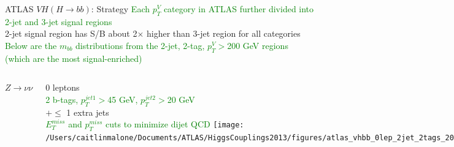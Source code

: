 \documentclass{beamer}
\begin{document}
\begin{frame}{ATLAS $VH (H\rightarrow bb)$: Strategy}
	\scriptsize
	\textcolor{Green}{Each $p_T^V$ category in ATLAS further divided into 2-jet and 3-jet signal regions}\\
	2-jet signal region has S/B about 2$\times$ higher than 3-jet region for all categories\\
	\textcolor{Green}{Below are the $m_{bb}$ distributions from the 2-jet, 2-tag, $p_T^V>$200 GeV regions (which are the most signal-enriched)}
	\vspace{-0.2cm}

	\begin{columns}[c]
	
			\begin{center} \scriptsize $Z\rightarrow\nu\nu$ \\ \end{center} 
			\vspace{-0.1cm}
			\tiny{0 leptons\\
			\textcolor{Green}{2 b-tags, $p_T^{jet1}>$45 GeV, $p_T^{jet2}>$20 GeV\\}
			$+\le$ 1 extra jets\\
			\textcolor{Green}{$E^{miss}_{T}$ and $p_T^{miss}$ cuts to minimize dijet QCD}
			}
			\texttt{[image: /Users/caitlinmalone/Documents/ATLAS/HiggsCouplings2013/figures/atlas\_vhbb\_0lep\_2jet\_2tags\_200GeV.pdf]}\\
			
			
			\begin{center} \scriptsize $W\rightarrow l\nu$ \\ \end{center} 
			\vspace{-0.1cm}
			\tiny{1 lepton\\
			\textcolor{Green}{2 b-tags, $p_T^{jet1}>$45 GeV, $p_T^{jet2}>$20 GeV\\}
			$+\le$ 1 extra jets\\
			\textcolor{Green}{$E^{miss}_{T}>$ 25 GeV\\}
			$m_T^W<$120 GeV
			}
			\texttt{[image: /Users/caitlinmalone/Documents/ATLAS/HiggsCouplings2013/figures/atlas\_vhbb\_1lep\_2jet\_2tags\_200GeV.pdf]}\\
			
			\begin{center} \scriptsize $Z\rightarrow ll$ \\ \end{center} 
			\vspace{-0.1cm}
			\tiny{2 leptons\\
			\textcolor{Green}{2 b-tags, $p_T^{jet1}>$45 GeV, $p_T^{jet2}>$20 GeV\\}
			$+\le$ 1 extra jets\\
			\textcolor{Green}{$E^{miss}_{T}<$ 60 GeV\\}
			83$<m_{ll}<$99 GeV
			}		
			\texttt{[image: /Users/caitlinmalone/Documents/ATLAS/HiggsCouplings2013/figures/atlas\_vhbb\_2lep\_2jet\_2tags\_200GeV.pdf]}\\
			

\end{columns}
\end{frame}
\end{document}
